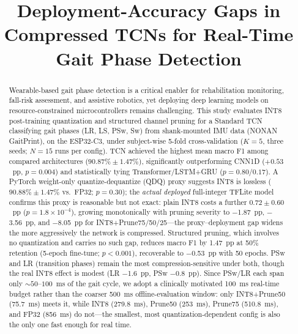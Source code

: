 \documentclass[conference]{IEEEtran}
\begin{document}
\title{Deployment-Accuracy Gaps in Compressed TCNs for Real-Time Gait Phase Detection}

\author{
}

\maketitle

\begin{abstract}
Wearable-based gait phase detection is a critical enabler for rehabilitation monitoring, fall-risk
assessment, and assistive robotics, yet deploying deep learning models on resource-constrained
microcontrollers remains challenging. This study evaluates INT8 post-training quantization and
structured channel pruning for a Standard TCN classifying gait phases (LR, LS, PSw, Sw) from
shank-mounted IMU data (NONAN GaitPrint), on the ESP32-C3, under subject-wise 5-fold
cross-validation ($K{=}5$, three seeds; $N{=}15$ runs per config).
TCN achieved the highest mean macro F1 among compared architectures ($90.87\%\pm1.47\%$),
significantly outperforming CNN1D ($+0.53$~pp, $p{=}0.004$) and statistically tying
Transformer/LSTM+GRU ($p{=}0.80$/$0.17$). A PyTorch weight-only quantize-dequantize (QDQ) proxy
suggests INT8 is lossless ($90.88\%\pm1.47\%$ vs.\ FP32; $p{=}0.30$); the \emph{actual deployed}
full-integer TFLite model confirms this proxy is reasonable but not exact: plain INT8 costs a
further $0.72\pm0.60$~pp ($p{=}1.8\times10^{-4}$), growing monotonically with pruning severity to
$-$1.87~pp, $-$3.56~pp, and $-$8.05~pp for INT8+Prune75/50/25---the proxy--deployment gap widens
the more aggressively the network is compressed. Structured pruning, which involves no quantization and
carries no such gap, reduces macro F1 by 1.47~pp at 50\% retention (5-epoch fine-tune;
$p{<}0.001$), recoverable to $-$0.53~pp with 50 epochs. PSw and LR (transition phases) remain the
most compression-sensitive under both, though the real INT8 effect is modest (LR $-$1.6~pp, PSw
$-$0.8~pp). Since PSw/LR each span only ${\sim}50$--$100$~ms of the gait cycle, we adopt a
clinically motivated 100~ms real-time budget rather than the coarser 500~ms offline-evaluation
window: only INT8+Prune50 (75.7~ms) meets it, while INT8 (279.8~ms), Prune50 (253~ms), Prune75
(510.8~ms), and FP32 (856~ms) do not---the smallest, most quantization-dependent config is also
the only one fast enough for real time.
\end{abstract}
\end{document}

